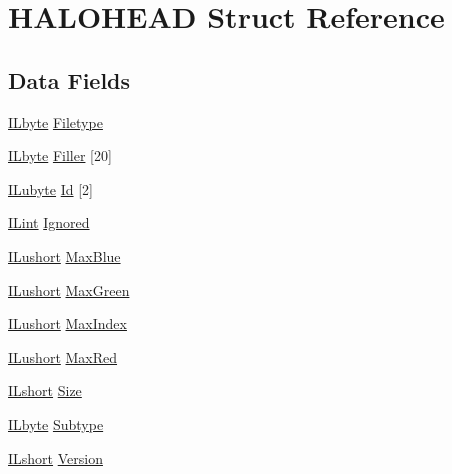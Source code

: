 \hypertarget{struct_h_a_l_o_h_e_a_d}{\section{H\-A\-L\-O\-H\-E\-A\-D Struct Reference}
\label{struct_h_a_l_o_h_e_a_d}
}
\subsection*{Data Fields}
\begin{DoxyCompactItemize}
\item 
\hyperlink{il_8h_a88e562dacd22f4efcf6f9d31b85d4f92}{I\-Lbyte} \hyperlink{struct_h_a_l_o_h_e_a_d_afe31145bb0402a15bea934431cbde3b3}{Filetype}
\item 
\hyperlink{il_8h_a88e562dacd22f4efcf6f9d31b85d4f92}{I\-Lbyte} \hyperlink{struct_h_a_l_o_h_e_a_d_abc765c2112b510e023fff070ae0c034a}{Filler} \mbox{[}20\mbox{]}
\item 
\hyperlink{il_8h_a8d2f04500100a86d1b00e98ab1b15a33}{I\-Lubyte} \hyperlink{struct_h_a_l_o_h_e_a_d_a0ea4006bcb2d803e77bdfbd2c4e43e2d}{Id} \mbox{[}2\mbox{]}
\item 
\hyperlink{il_8h_a288a97fb9e92e707a60b749d0039fafe}{I\-Lint} \hyperlink{struct_h_a_l_o_h_e_a_d_aa48837ed81c54c4efe122b4167ba000e}{Ignored}
\item 
\hyperlink{il_8h_af6287b43748354a7c4864da43ae56962}{I\-Lushort} \hyperlink{struct_h_a_l_o_h_e_a_d_a16cf7e501a10b6863cc51eecd8ffbd65}{Max\-Blue}
\item 
\hyperlink{il_8h_af6287b43748354a7c4864da43ae56962}{I\-Lushort} \hyperlink{struct_h_a_l_o_h_e_a_d_ad87d96087e9bc7638b73794455c70505}{Max\-Green}
\item 
\hyperlink{il_8h_af6287b43748354a7c4864da43ae56962}{I\-Lushort} \hyperlink{struct_h_a_l_o_h_e_a_d_a834ac3b22f70ee372f25adbbafdd832d}{Max\-Index}
\item 
\hyperlink{il_8h_af6287b43748354a7c4864da43ae56962}{I\-Lushort} \hyperlink{struct_h_a_l_o_h_e_a_d_ab32f932f023853a698f9575d34670d58}{Max\-Red}
\item 
\hyperlink{il_8h_afc75ded918970afe7517d3f7f0561db3}{I\-Lshort} \hyperlink{struct_h_a_l_o_h_e_a_d_acc434efe9df69cd2e13c646dfc6ff8a7}{Size}
\item 
\hyperlink{il_8h_a88e562dacd22f4efcf6f9d31b85d4f92}{I\-Lbyte} \hyperlink{struct_h_a_l_o_h_e_a_d_a7983926f0a17799db294a16bffeb3104}{Subtype}
\item 
\hyperlink{il_8h_afc75ded918970afe7517d3f7f0561db3}{I\-Lshort} \hyperlink{struct_h_a_l_o_h_e_a_d_a87b0716bec0fb12be5f5883eb71fcf01}{Version}
\end{DoxyCompactItemize}


